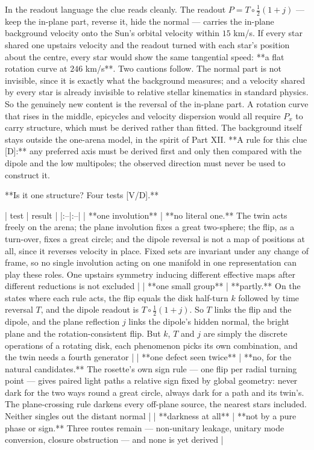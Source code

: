 In the readout language the clue reads cleanly. The readout $P = T\circ\tfrac12(1+j)$ — keep the in-plane part, reverse it, hide the normal — carries the in-plane background velocity onto the Sun's orbital velocity within $15$ km/s. If every star shared one upstairs velocity and the readout turned with each star's position about the centre, every star would show the same tangential speed: **a flat rotation curve at $246$ km/s**. Two cautions follow. The normal part is not invisible, since it is exactly what the background measures; and a velocity shared by every star is already invisible to relative stellar kinematics in standard physics. So the genuinely new content is the reversal of the in-plane part. A rotation curve that rises in the middle, epicycles and velocity dispersion would all require $P_x$ to carry structure, which must be derived rather than fitted. The background itself stays outside the one-arena model, in the spirit of Part XII. **A rule for this clue [D]:** any preferred axis must be derived first and only then compared with the dipole and the low multipoles; the observed direction must never be used to construct it.

**Is it one structure? Four tests [V/D].**

| test | result |
|:--|:--|
| **one involution** | **no literal one.** The twin acts freely on the arena; the plane involution fixes a great two-sphere; the flip, as a turn-over, fixes a great circle; and the dipole reversal is not a map of positions at all, since it reverses velocity in place. Fixed sets are invariant under any change of frame, so no single involution acting on one manifold in one representation can play these roles. One upstairs symmetry inducing different effective maps after different reductions is not excluded |
| **one small group** | **partly.** On the states where each rule acts, the flip equals the disk half-turn $k$ followed by time reversal $T$, and the dipole readout is $T\circ\tfrac12(1+j)$. So $T$ links the flip and the dipole, and the plane reflection $j$ links the dipole's hidden normal, the bright plane and the rotation-consistent flip. But $k$, $T$ and $j$ are simply the discrete operations of a rotating disk, each phenomenon picks its own combination, and the twin needs a fourth generator |
| **one defect seen twice** | **no, for the natural candidates.** The rosette's own sign rule — one flip per radial turning point — gives paired light paths a relative sign fixed by global geometry: never dark for the two ways round a great circle, always dark for a path and its twin's. The plane-crossing rule darkens every off-plane source, the nearest stars included. Neither singles out the distant normal |
| **darkness at all** | **not by a pure phase or sign.** Three routes remain — non-unitary leakage, unitary mode conversion, closure obstruction — and none is yet derived |

